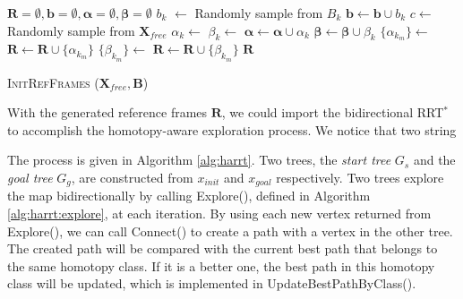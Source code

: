 \documentclass[letterpaper, 10 pt, conference]{ieeeconf}
\begin{document}

\begin{algorithm}[hbtp]
	\begin{algorithmic}[1]
		\State $ \bm{R} = \emptyset, \bm{b} = \emptyset, \bm{\alpha} = \emptyset, \bm{\beta} = \emptyset $
			\State $ b_{k} $ $ \leftarrow $ Randomly sample from $ B_{k} $
			\State $ \bm{b} \leftarrow \bm{b} \cup b_{k} $
		\EndFor
			\State $ c \leftarrow  $ Randomly sample from $ \bm{X}_{free} $
		\EndWhile
			\State $ \alpha_{k} \leftarrow $ 
			\State $ \beta_{k} \leftarrow $ 
			\State $ \bm{\alpha} \leftarrow \bm{\alpha} \cup \alpha_{k} $
			\State $ \bm{\beta} \leftarrow \bm{\beta} \cup \beta_{k} $			
		\EndFor
			\State $ \{ \alpha_{k_{m}} \} \leftarrow $ 
			\State $ \bm{R} \leftarrow \bm{R} \cup \{ \alpha_{k_{m}} \} $
		\EndFor
			\State $ \{ \beta_{k_{m}} \} \leftarrow $ 
			\State $ \bm{R} \leftarrow \bm{R} \cup \{ \beta_{k_{m}} \} $
		\EndFor
		\Return $ \bm{R} $
	\end{algorithmic}
	\caption{ \textsc{InitRefFrames} ($ \bm{X}_{free} , \bm{B} $) }
	\label{alg:harrt:init_ref_frames}
\end{algorithm} 

With the generated reference frames $ \mathbf{R} $, we could import the bidirectional RRT$^{*}$ to accomplish the homotopy-aware exploration process.
We notice that two string




The process is given in Algorithm \ref{alg:harrt}.
Two trees, the \emph{start tree} $ G_{s} $ and the \emph{goal tree} $ G_{g} $, are constructed from $ x_{init} $ and $ x_{goal} $ respectively.
Two trees explore the map bidirectionally by calling {\sc Explore}(), defined in Algorithm \ref{alg:harrt:explore}, at each iteration.
By using each new vertex returned from {\sc Explore}(), we can call {\sc Connect}() to create a path with a vertex in the other tree.
The created path will be compared with the current best path that belongs to the same homotopy class.
If it is a better one, the best path in this homotopy class will be updated, which is implemented in {\sc UpdateBestPathByClass}().
\end{document}
